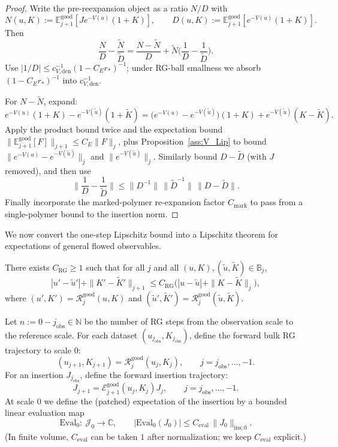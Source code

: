\begin{proof}
Write the pre-reexpansion object as a ratio $N/D$ with
\[
N(u,K):=\mathbb E_{j+1}^{\mathrm{good}}[J e^{-V(u)}(1+K)],
\qquad
D(u,K):=\mathbb E_{j+1}^{\mathrm{good}}[e^{-V(u)}(1+K)].
\]
Then
\[
\frac{N}{D}-\frac{\widetilde N}{\widetilde D}
=
\frac{N-\widetilde N}{D}
+\widetilde N\Big(\frac{1}{D}-\frac{1}{\widetilde D}\Big).
\]
Use $|1/D|\le c_{V,\mathrm{den}}^{-1}(1-C_E r_\ast)^{-1}$; under RG-ball smallness we absorb $(1-C_E r_\ast)^{-1}$ into $c_{V,\mathrm{den}}^{-1}$.

For $N-\widetilde N$, expand:
\[
e^{-V(u)}(1+K)-e^{-V(\widetilde u)}(1+\widetilde K)
=
\big(e^{-V(u)}-e^{-V(\widetilde u)}\big)(1+K) + e^{-V(\widetilde u)}(K-\widetilde K).
\]
Apply the product bound twice and the expectation bound $\|\mathbb E^{\mathrm{good}}_{j+1}[F]\|_{j+1}\le C_E\|F\|_j$,
plus Proposition~\ref{ass:V_Lip} to bound $\|e^{-V(u)}-e^{-V(\widetilde u)}\|_j$ and $\|e^{-V(\widetilde u)}\|_j$.
Similarly bound $D-\widetilde D$ (with $J$ removed), and then use
\[
\Big\|\frac{1}{D}-\frac{1}{\widetilde D}\Big\|\le \|D^{-1}\|\,\|\widetilde D^{-1}\|\,\|D-\widetilde D\|.
\]
Finally incorporate the marked-polymer re-expansion factor $C_{\mathrm{mark}}$ to pass from a single-polymer bound to the insertion norm.
\end{proof}

We now convert the one-step Lipschitz bound into a Lipschitz theorem for expectations of general flowed observables.

\begin{proposition}\label{ass:bulkLip}
There exists $C_{\mathrm{RG}}\ge 1$ such that for all $j$ and all $(u,K),(\widetilde u,\widetilde K)\in\mathbb B_j$,
\[
|u'-\widetilde u'|+\|K'-\widetilde K'\|_{j+1}
\le
C_{\mathrm{RG}}\Big(|u-\widetilde u|+\|K-\widetilde K\|_{j}\Big),
\]
where $(u',K')=\mathcal R^{\mathrm{good}}_j(u,K)$ and $(\widetilde u',\widetilde K')=\mathcal R^{\mathrm{good}}_j(\widetilde u,\widetilde K)$.
\end{proposition}

Let $n:=0-j_{\mathrm{obs}}\in\mathbb N$ be the number of RG steps from the observation scale to the reference scale.
For each dataset $(u_{j_{\mathrm{obs}}},K_{j_{\mathrm{obs}}})$, define the forward bulk RG trajectory to scale $0$:
\[
(u_{j+1},K_{j+1})=\mathcal R^{\mathrm{good}}_j(u_j,K_j),
\qquad j=j_{\mathrm{obs}},\dots,-1.
\]
For an insertion $J_{j_{\mathrm{obs}}}$, define the forward insertion trajectory:
\[
J_{j+1}=\mathcal E^{\mathrm{good}}_{j+1}(u_j,K_j)J_j,
\qquad j=j_{\mathrm{obs}},\dots,-1.
\]
At scale $0$ we define the (patched) expectation of the insertion by a bounded linear evaluation map
\[
\mathrm{Eval}_0:\ \mathscr J_0\to\mathbb C,
\qquad
|\mathrm{Eval}_0(J_0)|\le C_{\mathrm{eval}}\,\|J_0\|_{\mathrm{ins};0}.
\]
(In finite volume, $C_{\mathrm{eval}}$ can be taken $1$ after normalization; we keep $C_{\mathrm{eval}}$ explicit.)

